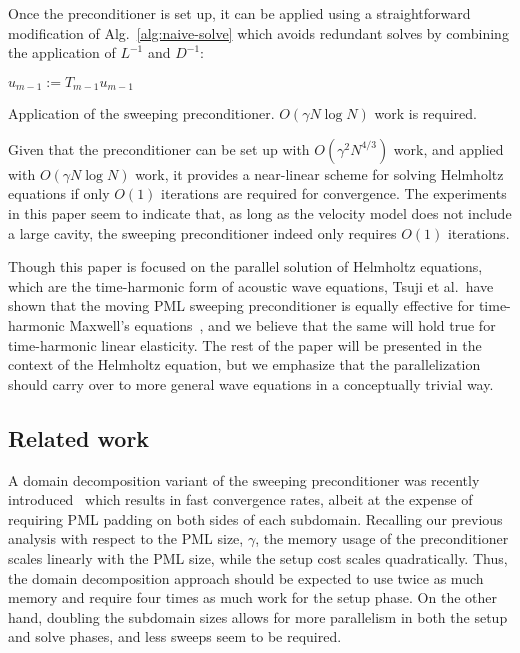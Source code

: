 Once the preconditioner is set up, it can be applied using a straightforward
modification of Alg.~\ref{alg:naive-solve} which avoids 
redundant solves by combining the application of $L^{-1}$ and $D^{-1}$:

\begin{algorithm2e}
\DontPrintSemicolon
$u_{m-1} := T_{m-1} u_{m-1}$\;
\caption{Application of the sweeping preconditioner. 
$O(\gamma N \log N)$ work is required.}
\label{alg:sweeping-apply}
\end{algorithm2e}
Given that the preconditioner can be set up with $O(\gamma^2 N^{4/3})$ work, 
and applied with $O(\gamma N \log N)$ work, it provides a near-linear scheme
for solving Helmholtz equations if only $O(1)$ iterations are required for 
convergence. The experiments in this paper seem to indicate that, as long as 
the velocity model does not include a large cavity, the sweeping preconditioner 
indeed only requires $O(1)$ iterations.


Though this paper is focused on the parallel solution of Helmholtz equations,
which are the time-harmonic form of acoustic wave equations, Tsuji et al.\ have
shown that the moving PML sweeping preconditioner is equally effective
for time-harmonic Maxwell's equations~\cite{Tsuji-JCP,Tsuji-JFM}, and we believe
that the same will hold true for time-harmonic linear elasticity. The rest
of the paper will be presented in the context of the Helmholtz equation, but
we emphasize that the parallelization should carry over to more general wave 
equations in a conceptually trivial way. 

\subsection{Related work}
A domain decomposition variant of the sweeping preconditioner was recently
introduced~\cite{Stolk-sweeping} which results in fast convergence rates, 
albeit at the expense of requiring PML padding on both sides of each subdomain.
Recalling our previous analysis with respect to the PML size, 
$\gamma$, the memory usage of the preconditioner scales linearly with the 
PML size, while the setup cost scales quadratically. Thus, the domain 
decomposition approach should be expected to use twice as much memory and 
require four times as much work for the setup phase. 
On the other hand, doubling the subdomain sizes allows for more parallelism 
in both the setup and solve phases, and less sweeps seem to be required.

